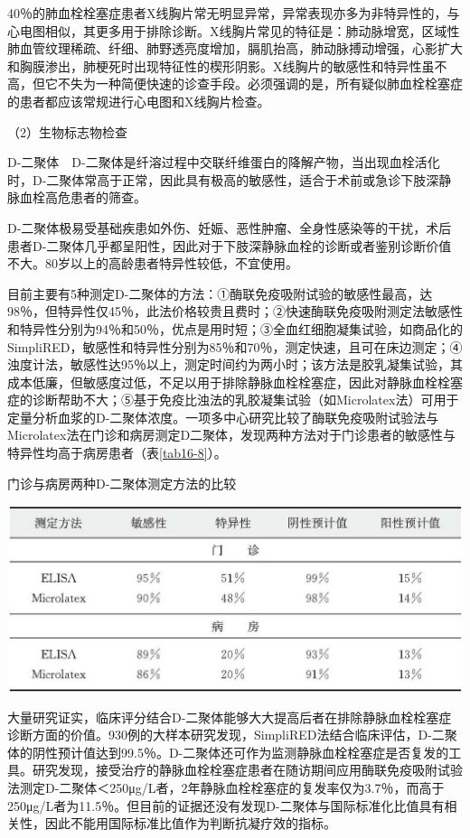 40％的肺血栓栓塞症患者X线胸片常无明显异常，异常表现亦多为非特异性的，与心电图相似，其更多用于排除诊断。X线胸片常见的特征是：肺动脉增宽，区域性肺血管纹理稀疏、纤细、肺野透亮度增加，膈肌抬高，肺动脉搏动增强，心影扩大和胸膜渗出，肺梗死时出现特征性的楔形阴影。X线胸片的敏感性和特异性虽不高，但它不失为一种简便快速的诊查手段。必须强调的是，所有疑似肺血栓栓塞症的患者都应该常规进行心电图和X线胸片检查。

（2）生物标志物检查

D-二聚体　D-二聚体是纤溶过程中交联纤维蛋白的降解产物，当出现血栓活化时，D-二聚体常高于正常，因此具有极高的敏感性，适合于术前或急诊下肢深静脉血栓高危患者的筛查。

D-二聚体极易受基础疾患如外伤、妊娠、恶性肿瘤、全身性感染等的干扰，术后患者D-二聚体几乎都呈阳性，因此对于下肢深静脉血栓的诊断或者鉴别诊断价值不大。80岁以上的高龄患者特异性较低，不宜使用。

目前主要有5种测定D-二聚体的方法：①酶联免疫吸附试验的敏感性最高，达98％，但特异性仅45％，此法价格较贵且费时；②快速酶联免疫吸附测定法敏感性和特异性分别为94％和50％，优点是用时短；③全血红细胞凝集试验，如商品化的SimpliRED，敏感性和特异性分别为85％和70％，测定快速，且可在床边测定；④浊度计法，敏感性达95％以上，测定时间约为两小时；该方法是胶乳凝集试验，其成本低廉，但敏感度过低，不足以用于排除静脉血栓栓塞症，因此对静脉血栓栓塞症的诊断帮助不大；⑤基于免疫比浊法的乳胶凝集试验（如Microlatex法）可用于定量分析血浆的D-二聚体浓度。一项多中心研究比较了酶联免疫吸附试验法与Microlatex法在门诊和病房测定D二聚体，发现两种方法对于门诊患者的敏感性与特异性均高于病房患者（表\ref{tab16-8}）。

\begin{table}[htbp]
\centering
\caption{门诊与病房两种D-二聚体测定方法的比较}
\label{tab16-8}
\includegraphics{./images/Image00126.jpg}
\end{table}

大量研究证实，临床评分结合D-二聚体能够大大提高后者在排除静脉血栓栓塞症诊断方面的价值。930例的大样本研究发现，SimpliRED法结合临床评估，D-二聚体的阴性预计值达到99.5％。D-二聚体还可作为监测静脉血栓栓塞症是否复发的工具。研究发现，接受治疗的静脉血栓栓塞症患者在随访期间应用酶联免疫吸附试验法测定D-二聚体＜250μg/L者，2年静脉血栓栓塞症的复发率仅为3.7％，而高于250μg/L者为11.5％。但目前的证据还没有发现D-二聚体与国际标准化比值具有相关性，因此不能用国际标准比值作为判断抗凝疗效的指标。


